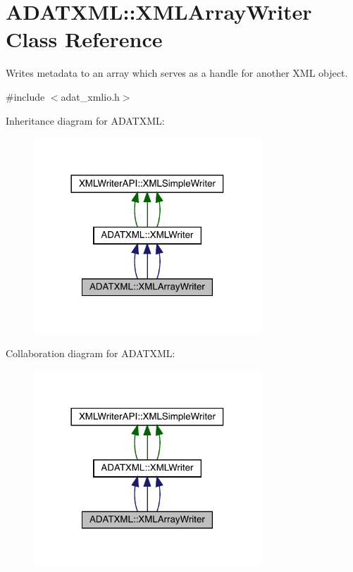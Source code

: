 \hypertarget{classADATXML_1_1XMLArrayWriter}{}\section{A\+D\+A\+T\+X\+ML\+:\+:X\+M\+L\+Array\+Writer Class Reference}
\label{classADATXML_1_1XMLArrayWriter}


Writes metadata to an array which serves as a handle for another X\+ML object.  




{\ttfamily \#include $<$adat\+\_\+xmlio.\+h$>$}



Inheritance diagram for A\+D\+A\+T\+X\+ML\+:
\nopagebreak
\begin{figure}[H]
\begin{center}
\leavevmode
\includegraphics[width=242pt]{d9/d9b/classADATXML_1_1XMLArrayWriter__inherit__graph}
\end{center}
\end{figure}


Collaboration diagram for A\+D\+A\+T\+X\+ML\+:
\nopagebreak
\begin{figure}[H]
\begin{center}
\leavevmode
\includegraphics[width=242pt]{d9/d05/classADATXML_1_1XMLArrayWriter__coll__graph}
\end{center}
\end{figure}
